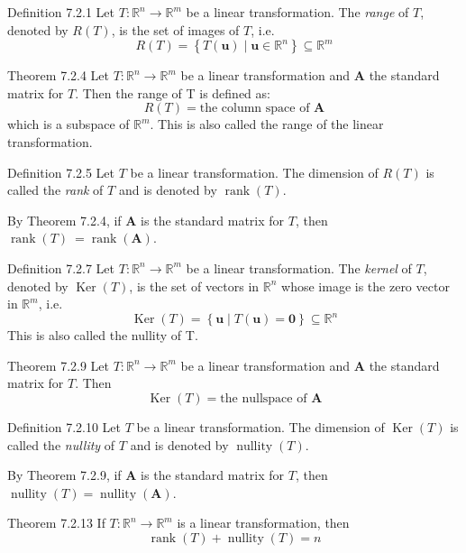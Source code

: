 \documentclass[10pt,landscape]{article}
\newcommand{\matr}[1]{\bm{#1}}
\newcommand{\vect}[1]{\bm{#1}}
\newcommand{\rank}{\operatorname{rank}}
\newcommand{\nullity}{\operatorname{nullity}}
\newcommand{\Ker}{\operatorname{Ker}}
\theoremstyle{definition}
\newcommand{\thistheoremname}{}
\newtheorem*{genericthm*}{\thistheoremname}
\newenvironment{namedthm*}[1]
{\renewcommand{\thistheoremname}{#1}\begin{genericthm*}}
{\end{genericthm*}}
\begin{document}
\begin{multicols}{3}
\begin{namedthm*}{Definition 7.2.1}
    Let \(T : \mathbb{R}^n \to \mathbb{R}^m\) be a linear transformation. The \textit{range} of \(T\), denoted by \(R(T)\), is the set of images of \(T\), i.e.
    \[
        R(T) = \left\{ T(\vect{u}) \mid \vect{u} \in \mathbb{R}^n \right\}\subseteq\mathbb{R}^m
    \]
\end{namedthm*}

\begin{namedthm*}{Theorem 7.2.4}
    Let \(T : \mathbb{R}^n \to \mathbb{R}^m\) be a linear transformation and \(\matr{A}\) the standard matrix for \(T\). Then the range of T is defined as:
    \[
        R(T) = \text{the column space of \(\matr{A}\)}
    \]
    which is a subspace of \(\mathbb{R}^m\). This is also called the range of the linear transformation.
\end{namedthm*}

\begin{namedthm*}{Definition 7.2.5}
    Let \(T\) be a linear transformation. The dimension of \(R(T)\) is called the \textit{rank} of \(T\) and is denoted by \(\rank(T)\).

    \medskip
    \noindent
    By Theorem 7.2.4, if \(\matr{A}\) is the standard matrix for \(T\), then \(\rank(T)\ = \rank(\matr{A})\).
\end{namedthm*}

\begin{namedthm*}{Definition 7.2.7}
    Let \(T : \mathbb{R}^n \to \mathbb{R}^m\) be a linear transformation. The \textit{kernel} of \(T\), denoted by \(\Ker(T)\), is the set of vectors in \(\mathbb{R}^n\) whose image is the zero vector in \(\mathbb{R}^m\), i.e.
    \[
        \Ker(T) = \left\{\vect{u}\mid T(\vect{u}) = \vect{0}\right\} \subseteq \mathbb{R}^n
    \]
    This is also called the nullity of T.
\end{namedthm*}

\begin{namedthm*}{Theorem 7.2.9}
    Let \(T : \mathbb{R}^n \to \mathbb{R}^m\) be a linear transformation and \(\matr{A}\) the standard matrix for \(T\). Then
    \[
        \Ker(T) = \text{the nullspace of \(\matr{A}\)}
    \]
\end{namedthm*}

\begin{namedthm*}{Definition 7.2.10}
    Let \(T\) be a linear transformation. The dimension of \(\Ker(T)\) is called the \textit{nullity} of \(T\) and is denoted by \(\nullity(T)\).

    \medskip
    \noindent
    By Theorem 7.2.9, if \(\matr{A}\) is the standard matrix for \(T\), then \(\nullity(T) = \nullity(\matr{A})\).
\end{namedthm*}

\begin{namedthm*}{Theorem 7.2.13}
    If \(T : \mathbb{R}^n \to \mathbb{R}^m\) is a linear transformation, then
    \[
        \rank(T) + \nullity(T) = n   
    \]
\end{namedthm*}

\end{multicols}
\end{document}
